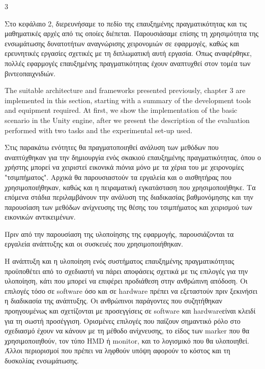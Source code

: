 3%


 \label{c:crypto}



Στο κεφάλαιο 2, διερευνήσαμε το πεδίο της επαυξημένης πραγματικότητας και τις μαθηματικές αρχές από τις οποίες διέπεται. Παρουσιάσαμε επίσης τη χρησιμότητα της ενσωμάτωσης δυνατοτήτων αναγνώρισης χειρονομιών σε εφαρμογές, καθώς και ερευνητικές εργασίες σχετικές με τη διπλωματική αυτή εργασία. 
Όπως αναφέρθηκε, πολλές εφαρμογές επαυξημένης πραγματικότητας έχουν αναπτυχθεί στον τομέα των βιντεοπαιχνιδιών. 

The suitable architecture and frameworks presented previously, chapter 3 are implemented in this section, starting with a summary of the development tools and equipment required. At first, we show the implementation of the basic scenario in the Unity engine, after we present the
description of the evaluation performed with two tasks and the experimental set-up used.



Στις παρακάτω ενότητες θα πραγματοποιηθεί ανάλυση των μεθόδων που αναπτύχθηκαν για την δημιουργία ενός σκακιού επαυξημένης πραγματικότητας, όπου ο χρήστης μπορεί να χειριστεί εικονικά πιόνια μόνο με τα χέρια του με χειρονομίες "τσιμπήματος". Αρχικά θα παρουσιαστούν τα εργαλεία και ο αισθητήρας που χρησιμοποιήθηκαν, καθώς και η πειραματική εγκατάσταση που χρησιμοποιήθηκε. Τα επόμενα στάδια περιλαμβάνουν την ανάλυση της διαδικασίας βαθμονόμησης και την παρουσίαση των μεθόδων ανίχνευσης της θέσης του τσιμπήματος και χειρισμού των εικονικών αντικειμένων. %

Πριν από την παρουσίαση της υλοποίησης της εφαρμογής, παρουσιάζονται τα εργαλεία ανάπτυξης και οι συσκευές που χρησιμοποιήθηκαν.


Η ανάπτυξη και η υλοποίηση ενός συστήματος επαυξημένης πραγματικότητας προϋποθέτει από το σχεδιαστή να πάρει αποφάσεις σχετικά με τις επιλογές για την υλοποίηση, κάτι που μπορεί να επιφέρει προδιάθεση στην ανθρώπινη απόδοση. Οι επιλογές τόσο σε software όσο και σε  hardware πρέπει να εξεταστούν πριν ξεκινήσει η διαδικασία της ανάπτυξης. Οι ανθρώπινοι παράγοντες που συζητήθηκαν προηγουμένως και σχετίζονται με προσεγγίσεις σε software και hardwareείναι κλειδί για τη σωστή προσέγγιση. Ορισμένες επιλογές που παίζουν σημαντικό ρόλο στο σχεδιασμό έχουν να κάνουν με τη μέθοδο ανίχνευσης, το είδος των marker που θα χρησιμοποιηθούν, τον τύπο HMD ή monitor, και το λογισμικό που θα υλοποιηθεί. Άλλοι περιορισμοί που πρέπει να ληφθούν υπόψη αφορούν το κόστος και τη δυσκολίας ενσωμάτωσης.


